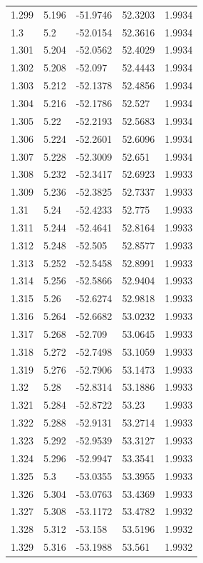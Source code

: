 \begin{tabular}{lllll}
1.299 & 5.196 & -51.9746 & 52.3203 & 1.9934 \\
1.3 & 5.2 & -52.0154 & 52.3616 & 1.9934 \\
1.301 & 5.204 & -52.0562 & 52.4029 & 1.9934 \\
1.302 & 5.208 & -52.097 & 52.4443 & 1.9934 \\
1.303 & 5.212 & -52.1378 & 52.4856 & 1.9934 \\
1.304 & 5.216 & -52.1786 & 52.527 & 1.9934 \\
1.305 & 5.22 & -52.2193 & 52.5683 & 1.9934 \\
1.306 & 5.224 & -52.2601 & 52.6096 & 1.9934 \\
1.307 & 5.228 & -52.3009 & 52.651 & 1.9934 \\
1.308 & 5.232 & -52.3417 & 52.6923 & 1.9933 \\
1.309 & 5.236 & -52.3825 & 52.7337 & 1.9933 \\
1.31 & 5.24 & -52.4233 & 52.775 & 1.9933 \\
1.311 & 5.244 & -52.4641 & 52.8164 & 1.9933 \\
1.312 & 5.248 & -52.505 & 52.8577 & 1.9933 \\
1.313 & 5.252 & -52.5458 & 52.8991 & 1.9933 \\
1.314 & 5.256 & -52.5866 & 52.9404 & 1.9933 \\
1.315 & 5.26 & -52.6274 & 52.9818 & 1.9933 \\
1.316 & 5.264 & -52.6682 & 53.0232 & 1.9933 \\
1.317 & 5.268 & -52.709 & 53.0645 & 1.9933 \\
1.318 & 5.272 & -52.7498 & 53.1059 & 1.9933 \\
1.319 & 5.276 & -52.7906 & 53.1473 & 1.9933 \\
1.32 & 5.28 & -52.8314 & 53.1886 & 1.9933 \\
1.321 & 5.284 & -52.8722 & 53.23 & 1.9933 \\
1.322 & 5.288 & -52.9131 & 53.2714 & 1.9933 \\
1.323 & 5.292 & -52.9539 & 53.3127 & 1.9933 \\
1.324 & 5.296 & -52.9947 & 53.3541 & 1.9933 \\
1.325 & 5.3 & -53.0355 & 53.3955 & 1.9933 \\
1.326 & 5.304 & -53.0763 & 53.4369 & 1.9933 \\
1.327 & 5.308 & -53.1172 & 53.4782 & 1.9932 \\
1.328 & 5.312 & -53.158 & 53.5196 & 1.9932 \\
1.329 & 5.316 & -53.1988 & 53.561 & 1.9932 \\

\end{tabular}

